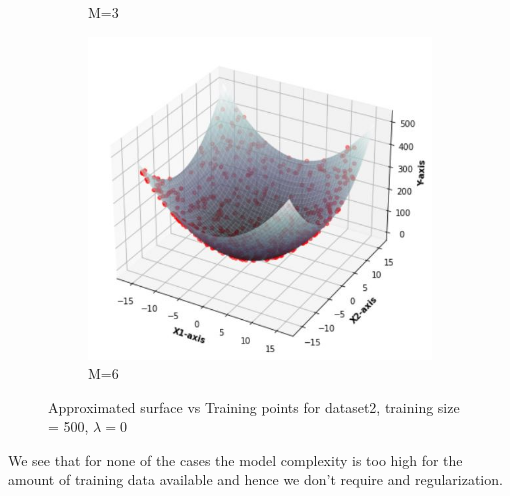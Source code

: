 \documentclass[11pt]{article}
\begin{document}
\begin{figure}[h]
\begin{subfigure}[b]{0.4\textwidth}
	\caption{    M=3}
	\label{fig:fig2.1.3.2}
	\end{subfigure}
	\hfill
	\begin{subfigure}[b]{0.4\textwidth}
	\centering
	\includegraphics[scale=0.5]{dataset2_500_lambda0_m6funcplot.jpg}
	\caption{    M=6}
	\label{fig:fig2.1.3.3}
	\end{subfigure}
\caption{Approximated surface vs Training points for dataset2, training size = 500, $\lambda = 0$}
\label{fig:fig2.1.3}
\end{figure}

We see that for none of the cases the model complexity is too high for the amount of training data available and hence we don't require and regularization.
\newpage
\end{document}
